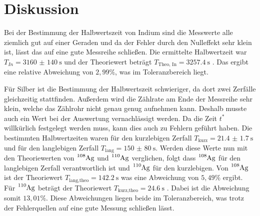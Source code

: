 \section{Diskussion}
Bei der Bestimmung der Halbwertszeit von Indium sind die Messwerte alle ziemlich
gut auf einer Geraden und da der Fehler durch den Nulleffekt sehr klein ist, lässt
das auf eine gute Messreihe schließen. Die ermittelte Halbwertzeit war
$T_{In} = \SI{3160(140)}{\second}$ und der Theoriewert beträgt $T_\text{Theo, In}
= \SI{3257.4}{\second}$ \cite{2}. Das ergibt eine relative Abweichung von $2,99 \%$,
was im Toleranzbereich liegt.

Für Silber ist die Bestimmung der Halbwertszeit schwieriger, da dort zwei Zerfälle
gleichzeitig stattfinden. Außerdem wird die Zählrate am Ende der Messreihe sehr
klein, welche das Zählrohr nicht genau genug aufnehmen kann. Deshalb musste auch ein
Wert bei der Auswertung vernachlässigt werden. Da die Zeit $t^*$ willkürlich festgelegt
werden muss, kann dies auch zu Fehlern geführt haben.
Die bestimmten Halbwertzeiten waren für den kurzlebigen Zerfall $T_\text{kurz} = \SI{21.4(17)}{\second}$
und für den langlebigen Zerfall $T_\text{lang} = \SI{150(80)}{\second}$.
Werden diese Werte nun mit den Theoriewerten von $\ce{^{108}Ag}$ und $\ce{^{110}Ag}$ verglichen,
folgt dass $\ce{^{108}Ag}$ für den langlebigen Zerfall verantwortlich ist und $\ce{^{110}Ag}$
für den kurzlebigen.
Von $\ce{^{108}Ag}$ ist der Theoriewert $T_\text{lang,theo} = \SI{142.2}{\second}$ \cite{2} was eine
Abweichung von $5,49 \%$ ergibt.
Für $\ce{^{110}Ag}$ beträgt der Theoriewert $T_\text{kurz,theo} = \SI{24.6}{\second}$ \cite{2}.
Dabei ist die Abweichung somit $13,01 \%$.
Diese Abweichungen liegen beide im Toleranzbereich, was trotz der Fehlerquellen auf
eine gute Messung schließen lässt.
